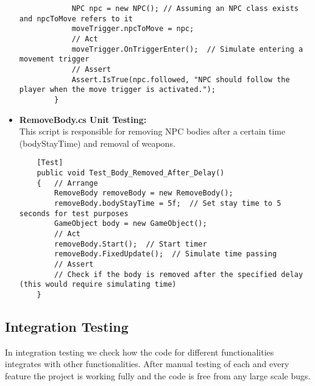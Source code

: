 \begin{itemize}
\begin{lstlisting}
			NPC npc = new NPC(); // Assuming an NPC class exists and npcToMove refers to it
			moveTrigger.npcToMove = npc;
			// Act
			moveTrigger.OnTriggerEnter();  // Simulate entering a movement trigger
			// Assert
			Assert.IsTrue(npc.followed, "NPC should follow the player when the move trigger is activated.");
		}
	\end{lstlisting}
	\item \textbf{RemoveBody.cs Unit Testing:}
	\\
	This script is responsible for removing NPC bodies after a certain time (bodyStayTime) and removal of weapons.
	\begin{lstlisting}
	[Test]
	public void Test_Body_Removed_After_Delay()
	{   // Arrange
		RemoveBody removeBody = new RemoveBody();
		removeBody.bodyStayTime = 5f;  // Set stay time to 5 seconds for test purposes
		GameObject body = new GameObject();
		// Act
		removeBody.Start();  // Start timer
		removeBody.FixedUpdate();  // Simulate time passing
		// Assert
		// Check if the body is removed after the specified delay (this would require simulating time)
	}
	\end{lstlisting}
\end{itemize}

\subsection{Integration Testing}
In integration testing we check how the code for different functionalities integrates with other functionalities. After manual testing of each and every feature the project is working fully and the code is free from any large scale bugs.

